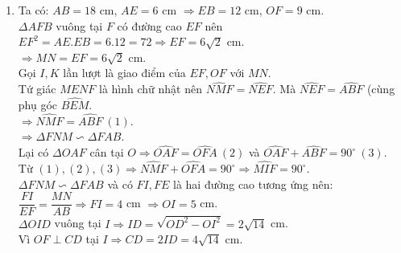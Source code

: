 \begin{ex}
{\begin{enumerate}
	$\Delta O_1AM$ cân tại $O_1\Rightarrow \widehat{MO_1E} =2\widehat{O_1AM}$.\\
	$\Delta O_2BN$ cân tại $O_2\Rightarrow \widehat{MO_2E} =2\widehat{O_2BN}$.\\
	$\Rightarrow \widehat{O_1AM}+\widehat{O_2BN}=90^\circ\Rightarrow \widehat{MFN}=90^\circ$.\\
	Mặt khác $\widehat{AME}=\widehat{BNE}=90^\circ$ (góc nội tiếp chắn nửa đường tròn).\\
	$\Rightarrow MENF$ là hình chữ nhật.\\
	$\Rightarrow \widehat{MEF}=\widehat{NME}$.\\
	Mà $\widehat{O_1EM}=\widehat{O_1ME}$ và $\widehat{NME}+\widehat{O_1ME}=90^\circ\Rightarrow \widehat{MEF}+\widehat{O_1EM}=90^\circ$\\ hay $EF\perp AB$ tại $E$.
	\item Ta có: $AB=18$ cm, $AE=6$ cm $\Rightarrow EB=12$ cm, $OF=9$ cm.\\
	$\Delta AFB$ vuông tại $F$ có đường cao $EF$ nên $EF^2=AE.EB=6.12=72\Rightarrow EF=6\sqrt{2}$ cm.\\
	$\Rightarrow MN=EF=6\sqrt{2}$ cm.\\
	Gọi $I,K$ lần lượt là giao điểm của $EF,OF$ với $MN$.\\
	Tứ giác $MENF$ là hình chữ nhật nên $\widehat{NMF}=\widehat{NEF}$. Mà $\widehat{NEF}=\widehat{ABF}$ (cùng phụ góc $\widehat{BEM}$.\\
	$\Rightarrow \widehat{NMF}=\widehat{ABF}\ (1)$.\\
	$\Rightarrow \Delta FNM\backsim\Delta FAB$.\\
	Lại có $\Delta OAF$ cân tại $O\Rightarrow \widehat{OAF}=\widehat{OFA}\ (2)$ và $\widehat{OAF}+\widehat{ABF}=90^\circ\ (3)$.\\
	Từ $(1), (2),(3)\Rightarrow \widehat{NMF}+\widehat{OFA}=90^\circ\Rightarrow \widehat{MIF}=90^\circ$.\\
	$\Delta FNM\backsim\Delta FAB$ và có $FI,FE$ là hai đường cao tương ứng nên: $\dfrac{FI}{EF}=\dfrac{MN}{AB}\Rightarrow FI=4$ cm $\Rightarrow OI=5$ cm.\\
	$\Delta OID$ vuông tại $I\Rightarrow ID=\sqrt{OD^2-OI^2}=2\sqrt{14}$ cm.\\
	Vì $OF\perp CD$ tại $I\Rightarrow CD=2ID=4\sqrt{14}$ cm. 
\end{enumerate}		
	}
\end{ex}

